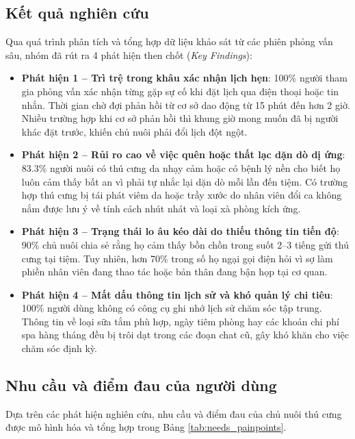 \subsection{Kết quả nghiên cứu}
Qua quá trình phân tích và tổng hợp dữ liệu khảo sát từ các phiên phỏng vấn sâu, nhóm đã rút ra 4 phát hiện then chốt (\textit{Key Findings}):
\begin{itemize}
    \item \textbf{Phát hiện 1 -- Trì trệ trong khâu xác nhận lịch hẹn}: 100\% người tham gia phỏng vấn xác nhận từng gặp sự cố khi đặt lịch qua điện thoại hoặc tin nhắn. Thời gian chờ đợi phản hồi từ cơ sở dao động từ 15 phút đến hơn 2 giờ. Nhiều trường hợp khi cơ sở phản hồi thì khung giờ mong muốn đã bị người khác đặt trước, khiến chủ nuôi phải đổi lịch đột ngột.
    \item \textbf{Phát hiện 2 -- Rủi ro cao về việc quên hoặc thất lạc dặn dò dị ứng}: 83.3\% người nuôi có thú cưng da nhạy cảm hoặc có bệnh lý nền cho biết họ luôn cảm thấy bất an vì phải tự nhắc lại dặn dò mỗi lần đến tiệm. Có trường hợp thú cưng bị tái phát viêm da hoặc trầy xước do nhân viên đổi ca không nắm được lưu ý về tính cách nhút nhát và loại xà phòng kích ứng.
    \item \textbf{Phát hiện 3 -- Trạng thái lo âu kéo dài do thiếu thông tin tiến độ}: 90\% chủ nuôi chia sẻ rằng họ cảm thấy bồn chồn trong suốt 2--3 tiếng gửi thú cưng tại tiệm. Tuy nhiên, hơn 70\% trong số họ ngại gọi điện hỏi vì sợ làm phiền nhân viên đang thao tác hoặc bản thân đang bận họp tại cơ quan.
    \item \textbf{Phát hiện 4 -- Mất dấu thông tin lịch sử và khó quản lý chi tiêu}: 100\% người dùng không có công cụ ghi nhớ lịch sử chăm sóc tập trung. Thông tin về loại sữa tắm phù hợp, ngày tiêm phòng hay các khoản chi phí spa hàng tháng đều bị trôi dạt trong các đoạn chat cũ, gây khó khăn cho việc chăm sóc định kỳ.
\end{itemize}

\subsection{Nhu cầu và điểm đau của người dùng}
Dựa trên các phát hiện nghiên cứu, nhu cầu và điểm đau của chủ nuôi thú cưng được mô hình hóa và tổng hợp trong Bảng \ref{tab:needs_painpoints}.

